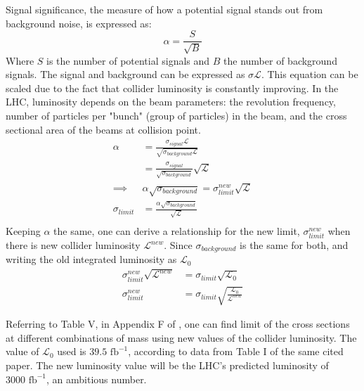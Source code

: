 \documentclass[12pt]{article}
\begin{document}
Signal significance, the measure of how a potential signal stands out from background noise, is expressed as:
\begin{equation}
    \alpha = \frac{S}{\sqrt{B}}
\end{equation}
Where $S$ is the number of potential signals and $B$ the number of background signals. The signal and background can be expressed as $\sigma \mathcal{L}$. This equation can be scaled due to the fact that collider luminosity is constantly improving. In the LHC, luminosity depends on the beam parameters: the revolution frequency, number of particles per "bunch" (group of particles) in the beam, and the cross sectional area of the beams at collision point.
\begin{equation}
    \begin{split}
        \alpha &= \frac{\sigma_{signal} \mathcal{L}}{\sqrt{\sigma_{background }\mathcal{L}}}
        \\&= \frac{\sigma_{signal}}{\sqrt{\sigma_{background}}} \sqrt{\mathcal{L}}
        \\\implies &\alpha \sqrt{\sigma_{background}} = \sigma_{limit}^{new}\sqrt{\mathcal{L}}
        \\\sigma_{limit} &=\frac{\alpha \sqrt{\sigma_{background}}}{\sqrt{\mathcal{L}}}  
        \\
    \end{split}
\end{equation}
Keeping $\alpha$ the same, one can derive a relationship for the new limit, $\sigma_{limit}^{new}$ when there is new collider luminosity $\mathcal{L}^{new}$. Since $\sigma_{background}$ is the same for both, and writing the old integrated luminosity as $\mathcal{L}_0$ 
\begin{equation}
    \begin{split}
    \sigma_{limit}^{new} \sqrt{\mathcal{L}^{new}} &= \sigma_{limit}\sqrt{\mathcal{L}_0}
        \\ \sigma_{limit}^{new}&= \sigma_{limit}\sqrt{\frac{\mathcal{L}_0}{\mathcal{L}^{new}}}
    \end{split}
\end{equation}

Referring to Table V, in Appendix F of \cite{Belyaev_2022}, one can find limit of the cross sections at different combinations of mass using new values of the collider luminosity. The value of $\mathcal{L}_0$ used is $39.5 \text{ fb} ^{-1}$, according to data from Table I of the same cited paper. The new luminosity value will be the LHC's predicted luminosity of $3000 \text{ fb} ^{-1}$, an ambitious number.
\end{document}
